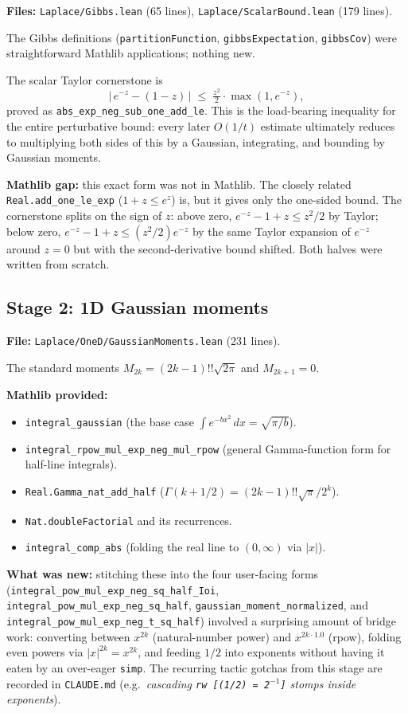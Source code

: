 \documentclass[11pt]{article}
\begin{document}
\textbf{Files:} \texttt{Laplace/Gibbs.lean} (65 lines),
\texttt{Laplace/ScalarBound.lean} (179 lines).

The Gibbs definitions (\texttt{partitionFunction}, \texttt{gibbsExpectation},
\texttt{gibbsCov}) were straightforward Mathlib applications; nothing
new.

The scalar Taylor cornerstone is
\[
  \big|\, e^{-z} - (1 - z)\, \big| \;\le\; \tfrac{z^2}{2}\cdot\max(1, e^{-z}),
\]
proved as \texttt{abs\_exp\_neg\_sub\_one\_add\_le}. This is the load-bearing
inequality for the entire perturbative bound: every later $O(1/t)$
estimate ultimately reduces to multiplying both sides of this by a
Gaussian, integrating, and bounding by Gaussian moments.

\textbf{Mathlib gap:} this exact form was not in Mathlib. The closely
related \texttt{Real.add\_one\_le\_exp} ($1 + z \le e^z$) is, but it gives
only the one-sided bound. The cornerstone splits on the sign of $z$:
above zero, $e^{-z} - 1 + z \le z^2/2$ by Taylor; below zero,
$e^{-z} - 1 + z \le (z^2/2)e^{-z}$ by the same Taylor expansion of $e^{-z}$
around $z = 0$ but with the second-derivative bound shifted. Both halves
were written from scratch.

\subsection{Stage 2: 1D Gaussian moments}

\textbf{File:} \texttt{Laplace/OneD/GaussianMoments.lean} (231 lines).

The standard moments $M_{2k} = (2k-1)!!\sqrt{2\pi}$ and $M_{2k+1} = 0$.

\textbf{Mathlib provided:}
\begin{itemize}
\item \texttt{integral\_gaussian} (the base case
$\int e^{-bx^2}\,dx = \sqrt{\pi/b}$).
\item \texttt{integral\_rpow\_mul\_exp\_neg\_mul\_rpow} (general
Gamma-function form for half-line integrals).
\item \texttt{Real.Gamma\_nat\_add\_half}
($\Gamma(k+1/2) = (2k-1)!!\sqrt\pi/2^k$).
\item \texttt{Nat.doubleFactorial} and its recurrences.
\item \texttt{integral\_comp\_abs} (folding the real line to $(0,\infty)$
via $|x|$).
\end{itemize}

\textbf{What was new:} stitching these into the four user-facing forms
(\texttt{integral\_pow\_mul\_exp\_neg\_sq\_half\_Ioi},
\texttt{integral\_pow\_mul\_exp\_neg\_sq\_half},
\texttt{gaussian\_moment\_normalized}, and
\texttt{integral\_pow\_mul\_exp\_neg\_t\_sq\_half}) involved a surprising
amount of bridge work: converting between $x^{2k}$ (natural-number power)
and $x^{2k\cdot 1.0}$ (rpow), folding even powers via $|x|^{2k} = x^{2k}$,
and feeding $1/2$ into exponents without having it eaten by an over-eager
\texttt{simp}. The recurring tactic gotchas from this stage are recorded
in \texttt{CLAUDE.md} (e.g.\ \emph{cascading \texttt{rw [(1/2) = 2$^{-1}$]}
stomps inside exponents}).
\end{document}
